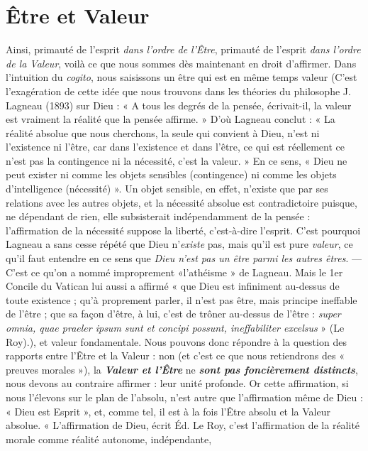 \section{Être et Valeur}%
Ainsi, primauté de l'esprit {\it dans
l'ordre de l’Être}, primauté de l'esprit {\it dans l’ordre de la Valeur}, voilà
ce que nous sommes dès maintenant en droit d’affirmer. Dans l’intuition
du {\it cogito}, nous saisissons un être qui est en même temps valeur
{\scriptsize (C'est l'exagération de cette idée que nous trouvons dans les théories du philosophe
J. Lagneau (1893) sur Dieu : « A tous les degrés de la pensée, écrivait-il, la valeur
est vraiment la réalité que la pensée affirme. » D'où Lagneau conclut : « La réalité
absolue que nous cherchons, la seule qui convient à Dieu, n’est ni l'existence ni l'être,
car dans l'existence et dans l’être, ce qui est réellement ce n’est pas la contingence ni la
nécessité, c’est la valeur. » En ce sens, « Dieu ne peut exister ni comme les objets sensibles
(contingence) ni comme les objets d'intelligence (nécessité) ». Un objet sensible,
en effet, n'existe que par ses relations avec les autres objets, et la nécessité absolue est
contradictoire puisque, ne dépendant de rien, elle subsisterait indépendamment de la
pensée : l'affirmation de la nécessité suppose la liberté, c'est-à-dire l'esprit. C’est pourquoi
Lagneau a sans cesse répété que Dieu n'{\it existe} pas, mais qu'il est pure {\it valeur},
ce qu'il faut entendre en ce sens que {\it Dieu n'est pas un être parmi les autres êtres}. —
C’est ce qu'on a nommé improprement «l'athéisme » de Lagneau. Mais le 1er Concile
du Vatican lui aussi a affirmé « que Dieu est infiniment au-dessus de toute existence ;
qu’à proprement parler, il n'est pas être, mais principe ineffable de l'être ; que sa façon
d’être, à lui, c'est de trôner au-dessus de l’être : {\it super omnia, quae praeler ipsum sunt
et concipi possunt, ineffabiliter excelsus} » (Le Roy).)},
et valeur fondamentale. Nous pouvons donc répondre à la
question des rapports entre l’Être et la Valeur : non (et c’est ce que
nous retiendrons des « preuves morales »), la \textbf{\textit {Valeur et l'Être}} ne
\textbf{\textit {sont pas foncièrement distincts}}, nous devons au contraire affirmer :
leur unité profonde. Or cette affirmation, si nous l’élevons sur le plan
de l’absolu, n’est autre que l’affirmation même de Dieu : « Dieu est
Esprit », et, comme tel, il est à la fois l’Être absolu et la Valeur
absolue. « L’affirmation de Dieu, écrit Éd. Le Roy, c’est l’affirmation
de la réalité morale comme réalité autonome, indépendante,
